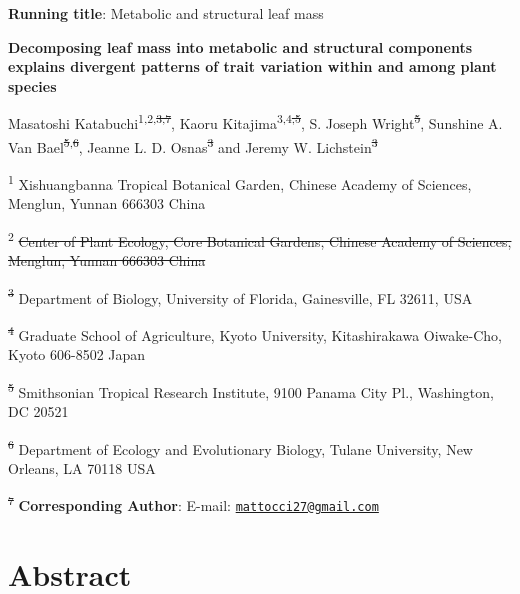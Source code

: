 \documentclass[
  12pt,
]{article}
\author{}
\date{\vspace{-2.5em}}
\providecommand{\DIFaddtex}[1]{{\protect\color{blue}\uwave{#1}}} %
\providecommand{\DIFdeltex}[1]{{\protect\color{red}\sout{#1}}}                      %
\providecommand{\DIFaddbegin}{} %
\providecommand{\DIFaddend}{} %
\providecommand{\DIFdelbegin}{} %
\providecommand{\DIFdelend}{} %
\providecommand{\DIFadd}[1]{\texorpdfstring{\DIFaddtex{#1}}{#1}} %
\providecommand{\DIFdel}[1]{\texorpdfstring{\DIFdeltex{#1}}{}} %
\newcommand{\DIFscaledelfig}{0.5}
\newlength{\DIFdelgraphicswidth} %
\newlength{\DIFdelgraphicsheight} %
\newcommand{\DIFaddincludegraphics}[2][]{{\color{blue}\fbox{\DIFOincludegraphics[#1]{#2}}}} %
\newcommand{\DIFdelincludegraphics}[2][]{%
\sbox{\DIFdelgraphicsbox}{\DIFOincludegraphics[#1]{#2}}%
\settoboxwidth{\DIFdelgraphicswidth}{\DIFdelgraphicsbox} %
\settoboxtotalheight{\DIFdelgraphicsheight}{\DIFdelgraphicsbox} %
\scalebox{\DIFscaledelfig}{%
\parbox[b]{\DIFdelgraphicswidth}{\usebox{\DIFdelgraphicsbox}\\[-\baselineskip] \rule{\DIFdelgraphicswidth}{0em}}\llap{\resizebox{\DIFdelgraphicswidth}{\DIFdelgraphicsheight}{%
\setlength{\unitlength}{\DIFdelgraphicswidth}%
\begin{picture}(1,1)%
\thicklines\linethickness{2pt} %
{\color[rgb]{1,0,0}\put(0,0){\framebox(1,1){}}}%
{\color[rgb]{1,0,0}\put(0,0){\line( 1,1){1}}}%
{\color[rgb]{1,0,0}\put(0,1){\line(1,-1){1}}}%
\end{picture}%
}\hspace*{3pt}}} %
} %
\DeclareRobustCommand{\DIFaddbegin}{\DIFOaddbegin \let\includegraphics\DIFaddincludegraphics} %
\DeclareRobustCommand{\DIFaddend}{\DIFOaddend \let\includegraphics\DIFOincludegraphics} %
\DeclareRobustCommand{\DIFdelbegin}{\DIFOdelbegin \let\includegraphics\DIFdelincludegraphics} %
\DeclareRobustCommand{\DIFdelend}{\DIFOaddend \let\includegraphics\DIFOincludegraphics} %
\begin{document}
\textbf{Running title}: Metabolic and structural leaf mass

\textbf{Decomposing leaf mass into metabolic and structural components explains divergent patterns of trait variation within and among plant species}

Masatoshi Katabuchi\textsuperscript{1,2,\DIFdelbegin \DIFdel{3,7}\DIFdelend \DIFaddbegin \DIFadd{6}\DIFaddend }, Kaoru Kitajima\textsuperscript{\DIFaddbegin \DIFadd{2,}\DIFaddend 3,4\DIFdelbegin \DIFdel{,5}\DIFdelend }, S. Joseph Wright\textsuperscript{\DIFdelbegin \DIFdel{5}\DIFdelend \DIFaddbegin \DIFadd{4}\DIFaddend }, Sunshine A. Van Bael\textsuperscript{\DIFdelbegin \DIFdel{5}\DIFdelend \DIFaddbegin \DIFadd{4}\DIFaddend ,\DIFdelbegin \DIFdel{6}\DIFdelend \DIFaddbegin \DIFadd{5}\DIFaddend }, Jeanne L. D. Osnas\textsuperscript{\DIFdelbegin \DIFdel{3}\DIFdelend \DIFaddbegin \DIFadd{2}\DIFaddend } and Jeremy W. Lichstein\textsuperscript{\DIFdelbegin \DIFdel{3}\DIFdelend \DIFaddbegin \DIFadd{2}\DIFaddend }

\textsuperscript{1} Xishuangbanna Tropical Botanical Garden, Chinese Academy of Sciences, Menglun, Yunnan 666303 China

\textsuperscript{2} \DIFdelbegin \DIFdel{Center of Plant Ecology, Core Botanical Gardens, Chinese Academy of Sciences, Menglun, Yunnan 666303 China
}%

\DIFdel{\textsuperscript{3} }\DIFdelend Department of Biology, University of Florida, Gainesville, FL 32611, USA

\textsuperscript{\DIFdelbegin \DIFdel{4}\DIFdelend \DIFaddbegin \DIFadd{3}\DIFaddend } Graduate School of Agriculture, Kyoto University, Kitashirakawa Oiwake-Cho, Kyoto 606-8502 Japan

\textsuperscript{\DIFdelbegin \DIFdel{5}\DIFdelend \DIFaddbegin \DIFadd{4}\DIFaddend } Smithsonian Tropical Research Institute, 9100 Panama City Pl., Washington, DC 20521

\textsuperscript{\DIFdelbegin \DIFdel{6}\DIFdelend \DIFaddbegin \DIFadd{5}\DIFaddend } Department of Ecology and Evolutionary Biology, Tulane University, New Orleans, LA 70118 USA

\textsuperscript{\DIFdelbegin \DIFdel{7}\DIFdelend \DIFaddbegin \DIFadd{6}\DIFaddend } \textbf{Corresponding Author}: E-mail: \href{mailto:mattocci27@gmail.com}{\nolinkurl{mattocci27@gmail.com}}

\newpage

\hypertarget{abstract}{%
\section{Abstract}\label{abstract}}
\end{document}
